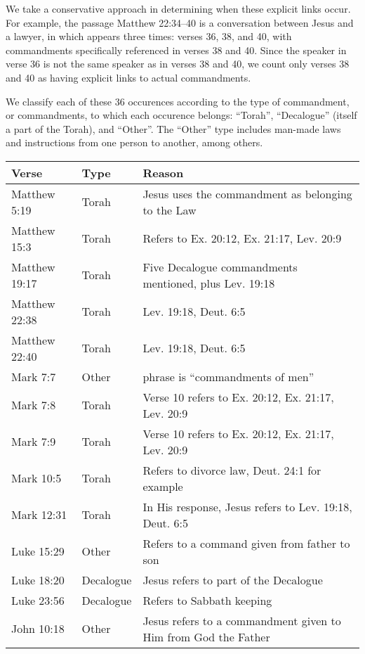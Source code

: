 \documentclass{article}
\newcommand{\entole}{\textepsilon\textnu\texttau\textomikron\textlambda\textepsilon\xspace}
\begin{document}
We take a conservative approach in determining when these explicit links
occur.  For example, the passage Matthew 22:34--40 is a conversation between
Jesus and a lawyer, in which \entole appears three times: verses 36, 38, and 40,
with commandments specifically referenced in verses 38 and 40.  Since the
speaker in verse 36 is not the same speaker as in verses 38 and 40, we count
only verses 38 and 40 as having explicit links to actual commandments.

We classify each of these 36 occurences according to the type of commandment,
or commandments,
to which each occurence belongs: ``Torah'', ``Decalogue'' (itself a part
of the Torah), and ``Other''.  The ``Other'' type includes man-made laws
and instructions from one person to another, among others.

\begin{table}
    \footnotesize
    \renewcommand\arraystretch{1.2}
    \begin{tabularx}{\textwidth}{@{}llX@{}}
    \toprule
    Verse & Type & Reason \\
    \midrule
    Matthew 5:19 & Torah & Jesus uses the commandment as belonging to the Law \\
    Matthew 15:3 & Torah & Refers to Ex. 20:12, Ex. 21:17, Lev. 20:9 \\
    Matthew 19:17 & Torah & Five Decalogue commandments mentioned, plus Lev. 19:18 \\
    Matthew 22:38 & Torah & Lev. 19:18, Deut. 6:5\\
    Matthew 22:40 & Torah & Lev. 19:18, Deut. 6:5\\
    Mark 7:7 & Other & phrase is ``commandments of men'' \\
    Mark 7:8 & Torah & Verse 10 refers to Ex. 20:12, Ex. 21:17, Lev. 20:9\\
    Mark 7:9 & Torah & Verse 10 refers to Ex. 20:12, Ex. 21:17, Lev. 20:9\\
    Mark 10:5 & Torah & Refers to divorce law, Deut. 24:1 for example\\
    Mark 12:31 & Torah & In His response, Jesus refers to Lev. 19:18, Deut. 6:5\\
    Luke 15:29 & Other & Refers to a command given from father to son\\
    Luke 18:20 & Decalogue & Jesus refers to part of the Decalogue\\
    Luke 23:56 & Decalogue & Refers to Sabbath keeping\\
    John 10:18 & Other & Jesus refers to a commandment given to Him from God the Father\\

\end{tabularx}
\end{table}
\end{document}
